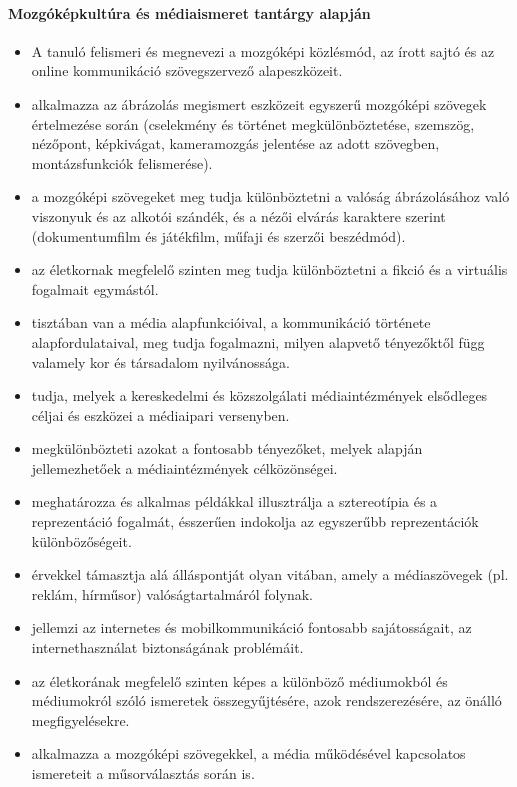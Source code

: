 \paragraph{Mozgóképkultúra és médiaismeret tantárgy alapján}
\begin{itemize}
\item A tanuló felismeri és megnevezi a mozgóképi közlésmód, az írott sajtó és az online kommunikáció szövegszervező alapeszközeit.
\item alkalmazza az ábrázolás megismert eszközeit egyszerű mozgóképi szövegek értelmezése során (cselekmény és történet megkülönböztetése, szemszög, nézőpont, képkivágat, kameramozgás jelentése az adott szövegben, montázsfunkciók felismerése).
\item a mozgóképi szövegeket meg tudja különböztetni a valóság ábrázolásához való viszonyuk és az alkotói szándék, és a nézői elvárás karaktere szerint (dokumentumfilm és játékfilm, műfaji és szerzői beszédmód).
\item az életkornak megfelelő szinten meg tudja különböztetni a fikció és a virtuális fogalmait egymástól.
\item tisztában van a média alapfunkcióival, a kommunikáció története alapfordulataival, meg tudja fogalmazni, milyen alapvető tényezőktől függ valamely kor és társadalom nyilvánossága.
\item tudja, melyek a kereskedelmi és közszolgálati médiaintézmények elsődleges céljai és eszközei a médiaipari versenyben.
\item megkülönbözteti azokat a fontosabb tényezőket, melyek alapján jellemezhetőek a médiaintézmények célközönségei.
\item meghatározza és alkalmas példákkal illusztrálja a sztereotípia és a reprezentáció fogalmát, ésszerűen indokolja az egyszerűbb reprezentációk különbözőségeit.
\item érvekkel támasztja alá álláspontját olyan vitában, amely a médiaszövegek (pl. reklám, hírműsor) valóságtartalmáról folynak.
\item jellemzi az internetes és mobilkommunikáció fontosabb sajátosságait, az internethasználat biztonságának problémáit.
\item az életkorának megfelelő szinten képes a különböző médiumokból és médiumokról szóló ismeretek összegyűjtésére, azok rendszerezésére, az önálló megfigyelésekre.
\item alkalmazza a mozgóképi szövegekkel, a média működésével kapcsolatos ismereteit a műsorválasztás során is.
\end{itemize}
